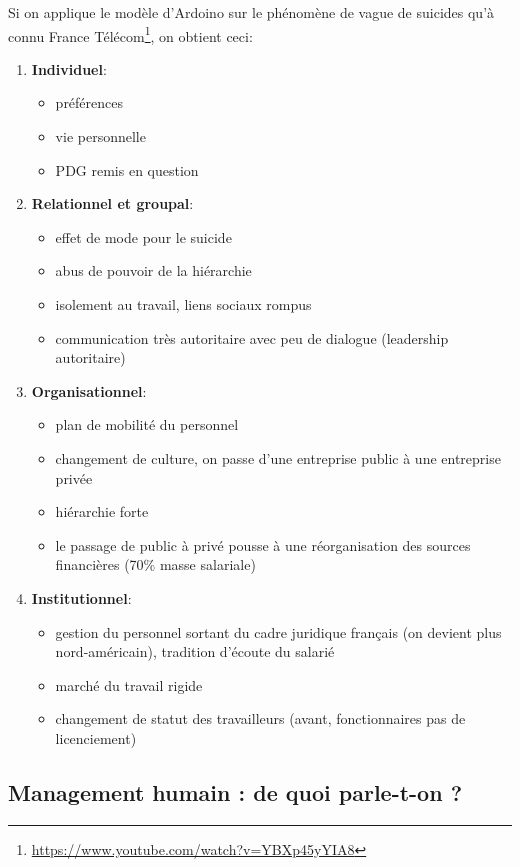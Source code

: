 \documentclass[12pt]{article}
\begin{document}
  Si on applique le modèle d'Ardoino sur le phénomène de vague de suicides qu'à connu France Télécom\footnote{\url{https://www.youtube.com/watch?v=YBXp45yYIA8}}, on obtient ceci:
  \begin{enumerate}
  \item \textbf{Individuel}:    \begin{itemize}
  								\item préférences
  								\item vie personnelle
  								\item PDG remis en question
  								\end{itemize}
  \item \textbf{Relationnel et groupal}:    \begin{itemize}
  											\item effet de mode pour le suicide
  											\item abus de pouvoir de la hiérarchie
  											\item isolement au travail, liens sociaux rompus
  											\item communication très autoritaire avec peu de dialogue (leadership autoritaire)
  											\end{itemize}
  \item \textbf{Organisationnel}:   \begin{itemize}
  									\item plan de mobilité du personnel
  									\item changement de culture, on passe d'une entreprise public à une entreprise privée
  									\item hiérarchie forte
  									\item le passage de public à privé pousse à une réorganisation des sources financières (70\% masse salariale)
  									\end{itemize}
  \item \textbf{Institutionnel}:  	\begin{itemize}
  									\item gestion du personnel sortant du cadre juridique français (on devient plus nord-américain), tradition d'écoute du salarié
  									\item marché du travail rigide
  									\item changement de statut des travailleurs (avant, fonctionnaires pas de licenciement)
  									\end{itemize}
\end{enumerate}   
  \subsection{Management humain : de quoi parle-t-on ?}
\end{document}
